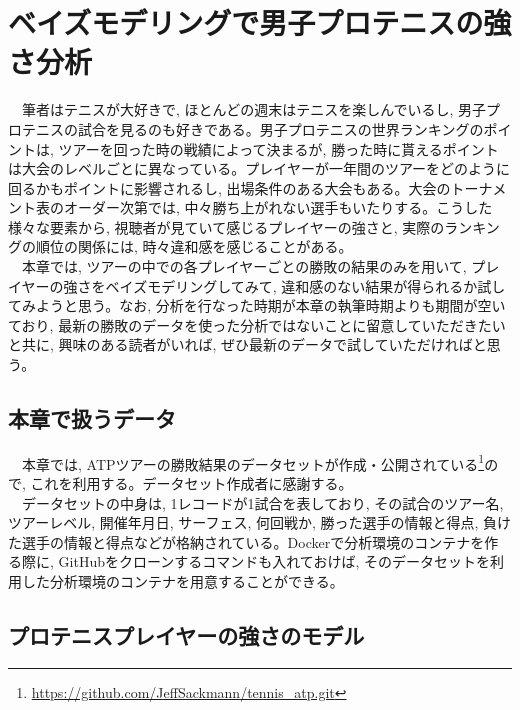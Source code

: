 \documentclass[uplatex,9pt,a5j]{jsarticle}
\begin{document}
\section{ベイズモデリングで男子プロテニスの強さ分析}
　筆者はテニスが大好きで, ほとんどの週末はテニスを楽しんでいるし, 男子プロテニスの試合を見るのも好きである。男子プロテニスの世界ランキングのポイントは, ツアーを回った時の戦績によって決まるが, 勝った時に貰えるポイントは大会のレベルごとに異なっている。プレイヤーが一年間のツアーをどのように回るかもポイントに影響されるし, 出場条件のある大会もある。大会のトーナメント表のオーダー次第では, 中々勝ち上がれない選手もいたりする。こうした様々な要素から, 視聴者が見ていて感じるプレイヤーの強さと, 実際のランキングの順位の関係には, 時々違和感を感じることがある。\\
　本章では, ツアーの中での各プレイヤーごとの勝敗の結果のみを用いて, プレイヤーの強さをベイズモデリングしてみて, 違和感のない結果が得られるか試してみようと思う。なお, 分析を行なった時期が本章の執筆時期よりも期間が空いており, 最新の勝敗のデータを使った分析ではないことに留意していただきたいと共に, 興味のある読者がいれば, ぜひ最新のデータで試していただければと思う。\\

\subsection{本章で扱うデータ}
　本章では, ATPツアーの勝敗結果のデータセットが作成・公開されている\footnote{\url{https://github.com/JeffSackmann/tennis_atp.git}}ので, これを利用する。データセット作成者に感謝する。\\
　データセットの中身は, 1レコードが1試合を表しており, その試合のツアー名, ツアーレベル, 開催年月日, サーフェス, 何回戦か, 勝った選手の情報と得点, 負けた選手の情報と得点などが格納されている。Dockerで分析環境のコンテナを作る際に, GitHubをクローンするコマンドも入れておけば, そのデータセットを利用した分析環境のコンテナを用意することができる。\\

\subsection{プロテニスプレイヤーの強さのモデル}
\end{document}
